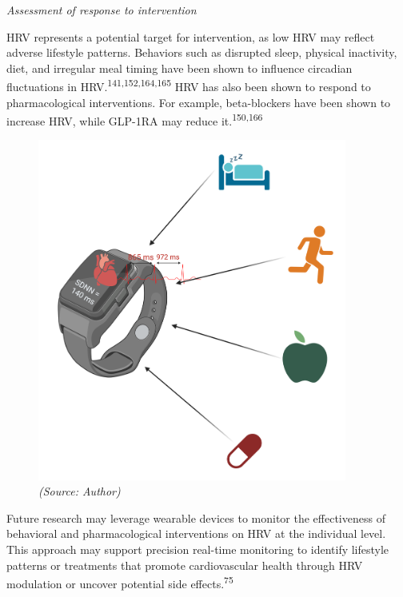 \documentclass[
  a4paper,
  headsepline=true,
  open=any]{scrbook}
\begin{document}
\emph{Assessment of response to intervention}

HRV represents a potential target for intervention, as low HRV may
reflect adverse lifestyle patterns. Behaviors such as disrupted sleep,
physical inactivity, diet, and irregular meal timing have been shown to
influence circadian fluctuations in
HRV.\textsuperscript{141,152,164,165} HRV has also been shown to respond
to pharmacological interventions. For example, beta-blockers have been
shown to increase HRV, while GLP-1RA may reduce
it.\textsuperscript{150,166}

\begin{figure}

\begin{minipage}[t]{\linewidth}

{\centering 

\includegraphics[width=4in,height=\textheight]{images/smartwatch.png}
\emph{(Source: Author)}

}

\end{minipage}%

\end{figure}

Future research may leverage wearable devices to monitor the
effectiveness of behavioral and pharmacological interventions on HRV at
the individual level. This approach may support precision real-time
monitoring to identify lifestyle patterns or treatments that promote
cardiovascular health through HRV modulation or uncover potential side
effects.\textsuperscript{75}
\end{document}

